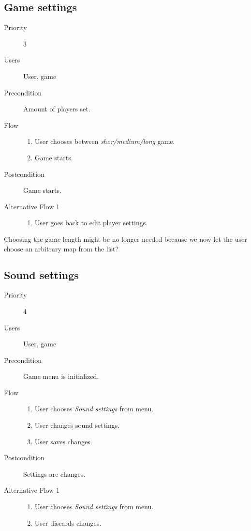 \documentclass[12pt,a4paper]{article}
\begin{document}
\subsection{Game settings}
\begin{description}
\item[Priority] 3
\item[Users] User, game
\item[Precondition] Amount of players set.
\item[Flow]\mbox{}
  \begin{enumerate}
  \item User chooses between \emph{shor/medium/long} game.
  \item Game starts.
  \end{enumerate}
\item[Postcondition] Game starts.
\item[Alternative Flow 1]\mbox{}
  \begin{enumerate}
  \item User goes back to edit player settings.
  \end{enumerate}
\end{description}

\begin{todo}
  Choosing the game length might be no longer needed because we now let
  the user choose an arbitrary map from the list?
\end{todo}

\subsection{Sound settings}
\begin{description}
\item[Priority] 4
\item[Users] User, game
\item[Precondition] Game menu is initialized.
\item[Flow]\mbox{}
  \begin{enumerate}
  \item User chooses \emph{Sound settings} from menu.
  \item User changes sound settings.
  \item User saves changes.
  \end{enumerate}
\item[Postcondition] Settings are changes. 
\item[Alternative Flow 1]\mbox{}
  \begin{enumerate}
  \item User chooses \emph{Sound settings} from menu.
  \item User discards changes.
  \end{enumerate}
\end{description}
\end{document}
